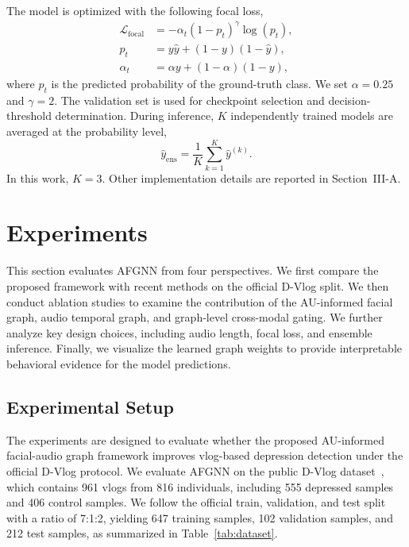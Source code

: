 \documentclass[conference]{IEEEtran}
\begin{document}
The model is optimized with the following focal loss,
\begin{equation}
\begin{aligned}
\mathcal{L}_{\mathrm{focal}}
&=-\alpha_t(1-p_t)^\gamma\log(p_t),\\
p_t&=y\hat{y}+(1-y)(1-\hat{y}),\\
\alpha_t&=\alpha y+(1-\alpha)(1-y),
\end{aligned}
\label{eqfocal}
\end{equation}
where $p_t$ is the predicted probability of the ground-truth class. We set $\alpha=0.25$ and $\gamma=2$. The validation set is used for checkpoint selection and decision-threshold determination. During inference, $K$ independently trained models are averaged at the probability level,
\begin{equation}
\hat{y}_{\mathrm{ens}}
=
\frac{1}{K}\sum_{k=1}^{K}\hat{y}^{(k)}.
\label{eqensemble}
\end{equation}
In this work, $K=3$. Other implementation details are reported in Section~III-A.

\section{Experiments}
\label{sec:experiments}

This section evaluates AFGNN from four perspectives. We first compare the proposed framework with recent methods on the official D-Vlog split. We then conduct ablation studies to examine the contribution of the AU-informed facial graph, audio temporal graph, and graph-level cross-modal gating. We further analyze key design choices, including audio length, focal loss, and ensemble inference. Finally, we visualize the learned graph weights to provide interpretable behavioral evidence for the model predictions.


\subsection{Experimental Setup}

The experiments are designed to evaluate whether the proposed AU-informed facial-audio graph framework improves vlog-based depression detection under the official D-Vlog protocol. We evaluate AFGNN on the public D-Vlog dataset~\cite{yoon2022dvlog}, which contains 961 vlogs from 816 individuals, including 555 depressed samples and 406 control samples. We follow the official train, validation, and test split with a ratio of 7:1:2, yielding 647 training samples, 102 validation samples, and 212 test samples, as summarized in Table~\ref{tab:dataset}.
\end{document}
